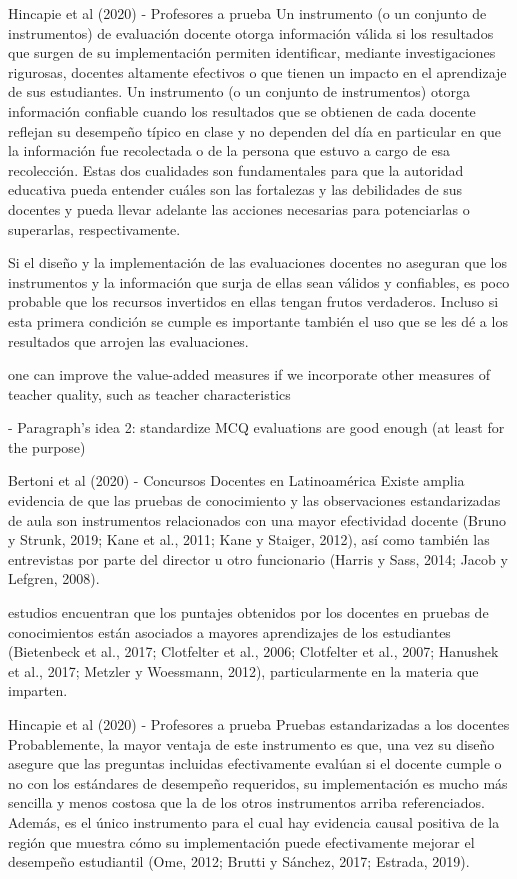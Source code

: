 Hincapie et al (2020) - Profesores a prueba
Un instrumento (o un conjunto de instrumentos) de evaluación docente otorga información válida si los resultados que surgen de su implementación permiten identificar, mediante investigaciones rigurosas, docentes altamente efectivos o que tienen un impacto en el aprendizaje de sus estudiantes. Un instrumento (o un conjunto de instrumentos) otorga información confiable cuando los resultados que se obtienen de cada docente reflejan su desempeño típico en clase y no dependen del día en particular en que la información fue recolectada o de la persona que estuvo a cargo de esa recolección. Estas dos cualidades son fundamentales para que la autoridad educativa pueda entender cuáles son las fortalezas y las debilidades de sus docentes y pueda llevar adelante las acciones necesarias para potenciarlas o superarlas, respectivamente.


Si el diseño y la implementación de las evaluaciones docentes no aseguran que los instrumentos y la información que surja de ellas sean válidos y confiables, es poco probable que los recursos invertidos en ellas tengan frutos verdaderos. Incluso si esta primera condición se cumple es importante también el uso que se les dé a los resultados que arrojen las evaluaciones.

one can improve the value-added measures if we incorporate other measures of teacher quality, such as teacher characteristics \citep{Chetty_et_al_2014a}


- Paragraph's idea 2: standardize MCQ evaluations are good enough (at least for the purpose)

Bertoni et al (2020) - Concursos Docentes en Latinoamérica
Existe amplia evidencia de que las pruebas de conocimiento y las observaciones estandarizadas de aula son instrumentos relacionados con una mayor efectividad docente (Bruno y Strunk, 2019; Kane et al., 2011; Kane y Staiger, 2012), así como también las entrevistas por parte del director u otro funcionario (Harris y Sass, 2014; Jacob y Lefgren, 2008).

estudios encuentran que los puntajes obtenidos por los docentes en pruebas de conocimientos están asociados a mayores aprendizajes de los estudiantes (Bietenbeck et al., 2017; Clotfelter et al., 2006; Clotfelter et al., 2007; Hanushek et al., 2017; Metzler y Woessmann, 2012), particularmente en la materia que imparten.


Hincapie et al (2020) - Profesores a prueba
Pruebas estandarizadas a los docentes
Probablemente, la mayor ventaja de este instrumento es que, una vez su diseño asegure que las preguntas incluidas efectivamente evalúan si el docente cumple o no con los estándares de desempeño requeridos, su implementación es mucho más sencilla y menos costosa que la de los otros instrumentos arriba referenciados. Además, es el único instrumento para el cual hay evidencia causal positiva de la región que muestra cómo su implementación puede efectivamente mejorar el desempeño estudiantil (Ome, 2012; Brutti y Sánchez, 2017; Estrada, 2019).


